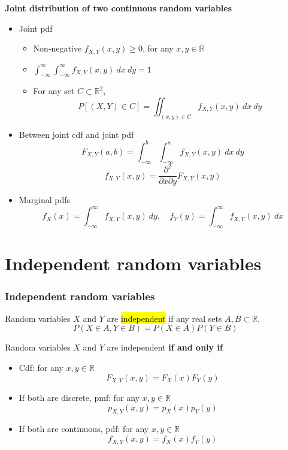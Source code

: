 \documentclass[slidestop,compress,mathserif]{beamer}
\begin{document}

\begin{frame}%

{\bf Joint distribution of two continuous random variables }
\begin{itemize}
\item Joint pdf
  \begin{itemize}
  \item Non-negative $f_{X, Y}(x, y) \geq 0$, for any $x, y \in \mathbb{R}$
  \item $\int_{-\infty}^{\infty} \int_{-\infty}^{\infty} f_{X, Y}(x,y) ~dx~dy = 1$
  \item For any set $C \subset \mathbb{R}^2$,
  \[ P[(X, Y) \in C] = \iint_{(x, y) \in C} f_{X, Y}(x,y) ~dx~dy\]
  \end{itemize}
\item Between joint cdf and joint pdf
\[ F_{X, Y}(a,b) = \int_{-\infty}^{b} \int_{-\infty}^{a}f_{X, Y}(x,y)~dx~dy \]
\[ f_{X, Y}(x,y) = \frac{\partial^2}{\partial x \partial y} F_{X, Y}(x,y) \]

\item Marginal pdfs
\[ f_X(x) = \int_{-\infty}^\infty f_{X, Y}(x,y)~dy, \quad f_Y(y) = \int_{-\infty}^\infty f_{X, Y}(x,y)~dx \]
\end{itemize}


\end{frame}



\section{Independent random variables}
\begin{frame}\frametitle{Independent random variables}
\begin{defn}
Random variables $X$ and $Y$ are \hl{independent} if any real sets $A, B \subset \mathbb{R}$,
\[P(X \in A, Y \in B) = P(X \in A) P(Y \in B)\]
\end{defn}

\pause Random variables $X$ and $Y$ are independent {\bf if and only if}
\begin{itemize}
\item Cdf: for any $x, y \in \mathbb{R}$
\[F_{X, Y}(x, y) = F_X(x) F_Y(y)\]
\item \pause If both are discrete, pmf: for any $x, y \in \mathbb{R}$
\[p_{X, Y}(x, y) = p_X(x) p_Y(y)\]
\item \pause If both are continuous, pdf: for any $x, y \in \mathbb{R}$
\[f_{X, Y}(x, y) = f_X(x) f_Y(y)\]

\end{itemize}
\end{frame}
\end{document}
